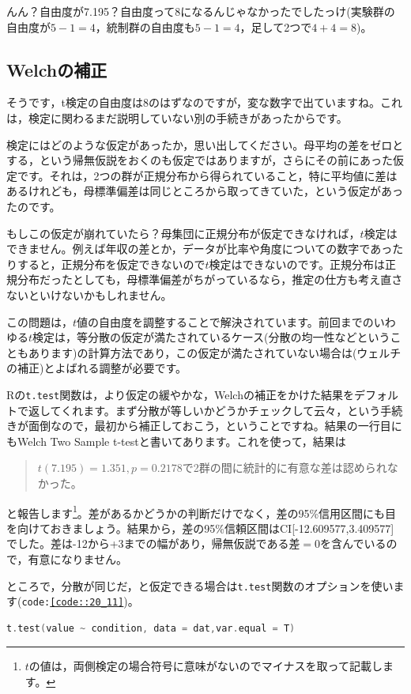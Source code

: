 \documentclass{ltjsbook}
\begin{document}
んん？自由度が7.195？自由度って8になるんじゃなかったでしたっけ(実験群の自由度が$5-1=4$，統制群の自由度も$5-1=4$，足して2つで$4+4=8$)。

\subsection{Welchの補正}
そうです，t検定の自由度は$8$のはずなのですが，変な数字で出ていますね。これは，検定に関わるまだ説明していない別の手続きがあったからです。

検定にはどのような仮定があったか，思い出してください。母平均の差をゼロとする，という帰無仮説をおくのも仮定ではありますが，さらにその前にあった仮定です。それは，2つの群が正規分布から得られていること，特に平均値に差はあるけれども，母標準偏差は同じところから取ってきていた，という仮定があったのです。

もしこの仮定が崩れていたら？母集団に正規分布が仮定できなければ，$t$検定はできません。例えば年収の差とか，データが比率や角度についての数字であったりすると，正規分布を仮定できないので$t$検定はできないのです。正規分布は正規分布だったとしても，母標準偏差がちがっているなら，推定の仕方も考え直さないといけないかもしれません。

この問題は，$t$値の自由度を調整することで解決されています。前回までのいわゆる$t$検定は，等分散の仮定が満たされているケース(分散の均一性などということもあります)の計算方法であり，この仮定が満たされていない場合は(ウェルチの補正)とよばれる調整が必要です。

Rの\texttt{t.test}関数は，より仮定の緩やかな，Welchの補正をかけた結果をデフォルトで返してくれます。まず分散が等しいかどうかチェックして云々，という手続きが面倒なので，最初から補正しておこう，ということですね。結果の一行目にもWelch Two Sample t-testと書いてあります。これを使って，結果は
\begin{quote}
    $t(7.195)=1.351,p = 0.2178$で2群の間に統計的に有意な差は認められなかった。
\end{quote}
と報告します\footnote{$t$の値は，両側検定の場合符号に意味がないのでマイナスを取って記載します。}。差があるかどうかの判断だけでなく，差の95\%信用区間にも目を向けておきましょう。結果から，差の95\%信頼区間はCI[-12.609577,3.409577]でした。差は-12から+3までの幅があり，帰無仮説である差$=0$を含んでいるので，有意になりません。


ところで，分散が同じだ，と仮定できる場合は\texttt{t.test}関数のオプションを使います(\texttt{code:\ref{code::20_11}})。

\begin{lstlisting}[language=c++,label={code::20_11},caption={分散のオプション指定}]
t.test(value ~ condition, data = dat,var.equal = T)
\end{lstlisting}
\end{document}
